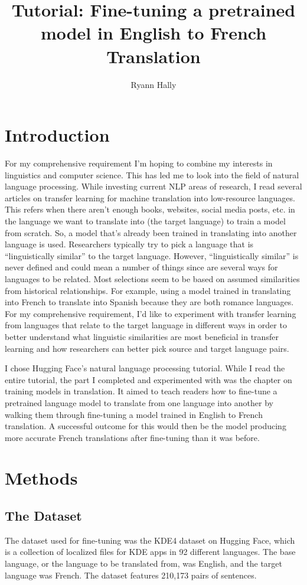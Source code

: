 \documentclass[10pt,twocolumn]{article}
\title{Tutorial: Fine-tuning a pretrained model in English to French Translation}
\author{Ryann Hally}
\affiliation{Occidental College}
\begin{document}
\maketitle
\section{Introduction}
For my comprehensive requirement I’m hoping to combine my interests in linguistics and computer science. This has led me to look into the field of natural language processing. While investing current NLP areas of research, I read several articles on transfer learning for machine translation into low-resource languages. This refers when there aren't enough books, websites, social media posts, etc. in the language we want to translate into (the target language) to train a model from scratch. So, a model that's already been trained in translating into another language is used. Researchers typically try to pick a language that is “linguistically similar” to the target language. However, “linguistically similar” is never defined and could mean a number of things since are several ways for languages to be related. Most selections seem to be based on assumed similarities from historical relationships. For example, using a model trained in translating into French to translate into Spanish because they are both romance languages. For my comprehensive requirement, I'd like to experiment with transfer learning from languages that relate to the target language in different ways in order to better understand what linguistic similarities are most beneficial in transfer learning and how researchers can better pick source and target language pairs.

I chose Hugging Face’s natural language processing tutorial. While I read the entire tutorial, the part I completed and experimented with was the chapter on training models in translation. It aimed to teach readers how to fine-tune a pretrained language model to translate from one language into another by walking them through fine-tuning a model trained in English to French translation. A successful outcome for this would then be the model producing more accurate French translations after fine-tuning than it was before.


\section{Methods}

\subsection{The Dataset}
The dataset used for fine-tuning was the KDE4 dataset on Hugging Face, which is a collection of localized files for KDE apps in 92 different languages. The base language, or the language to be translated from, was English, and the target language was French. The dataset features 210,173 pairs of sentences.
\end{document}
